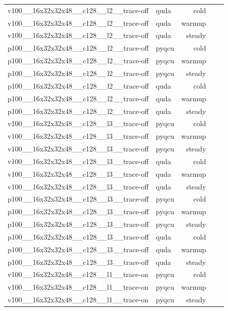 \begin{table}[htbp]
\begin{tabular}{@{}llrrr@{}}
v100\_\_16x32x32x48\_\_c128\_\_l2\_\_trace-off & quda & cold &  &  \\
v100\_\_16x32x32x48\_\_c128\_\_l2\_\_trace-off & quda & warmup &  &  \\
v100\_\_16x32x32x48\_\_c128\_\_l2\_\_trace-off & quda & steady &  &  \\
p100\_\_16x32x32x48\_\_c128\_\_l2\_\_trace-off & pyqcu & cold &  &  \\
p100\_\_16x32x32x48\_\_c128\_\_l2\_\_trace-off & pyqcu & warmup &  &  \\
p100\_\_16x32x32x48\_\_c128\_\_l2\_\_trace-off & pyqcu & steady &  &  \\
p100\_\_16x32x32x48\_\_c128\_\_l2\_\_trace-off & quda & cold &  &  \\
p100\_\_16x32x32x48\_\_c128\_\_l2\_\_trace-off & quda & warmup &  &  \\
p100\_\_16x32x32x48\_\_c128\_\_l2\_\_trace-off & quda & steady &  &  \\
v100\_\_16x32x32x48\_\_c128\_\_l3\_\_trace-off & pyqcu & cold &  &  \\
v100\_\_16x32x32x48\_\_c128\_\_l3\_\_trace-off & pyqcu & warmup &  &  \\
v100\_\_16x32x32x48\_\_c128\_\_l3\_\_trace-off & pyqcu & steady &  &  \\
v100\_\_16x32x32x48\_\_c128\_\_l3\_\_trace-off & quda & cold &  &  \\
v100\_\_16x32x32x48\_\_c128\_\_l3\_\_trace-off & quda & warmup &  &  \\
v100\_\_16x32x32x48\_\_c128\_\_l3\_\_trace-off & quda & steady &  &  \\
p100\_\_16x32x32x48\_\_c128\_\_l3\_\_trace-off & pyqcu & cold &  &  \\
p100\_\_16x32x32x48\_\_c128\_\_l3\_\_trace-off & pyqcu & warmup &  &  \\
p100\_\_16x32x32x48\_\_c128\_\_l3\_\_trace-off & pyqcu & steady &  &  \\
p100\_\_16x32x32x48\_\_c128\_\_l3\_\_trace-off & quda & cold &  &  \\
p100\_\_16x32x32x48\_\_c128\_\_l3\_\_trace-off & quda & warmup &  &  \\
p100\_\_16x32x32x48\_\_c128\_\_l3\_\_trace-off & quda & steady &  &  \\
v100\_\_16x32x32x48\_\_c128\_\_l1\_\_trace-on & pyqcu & cold &  &  \\
v100\_\_16x32x32x48\_\_c128\_\_l1\_\_trace-on & pyqcu & warmup &  &  \\
v100\_\_16x32x32x48\_\_c128\_\_l1\_\_trace-on & pyqcu & steady &  &  \\

\end{tabular}
\end{table}
